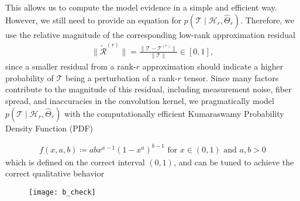 This allows us to compute the model evidence in a simple and efficient way.
However, we still need to provide an equation for $p
\left( \mathcal{T} \mid \mathcal{H}_r , \hat{\Theta}_r \right)$. Therefore, we
use the relative magnitude of the corresponding low-rank approximation residual 
\begin{align}
	\| \tilde{\mathcal{R}}^{\left( r \right)} \| = \frac{ \| \mathcal{T} -
	\mathcal{T}^{\left( r \right)} \| }{ \| \mathcal{T} \|} \in \left[ 0,1
	\right],
	\label{eq:residual}
\end{align}
since a smaller residual from a rank-$r$ approximation should indicate a higher probability of $\mathcal{T}$ being a perturbation of a rank-$r$ tensor. Since many factors contribute to the magnitude of this residual, including measurement noise, fiber spread, and inaccuracies in the convolution kernel, we pragmatically model
$p
\left( \mathcal{T} \mid \mathcal{H}_r , \hat{\Theta}_r \right)$ with the computationally efficient Kumaraswamy Probability Density Function (PDF) \cite{Kumaraswamy1980}

\begin{align}
	f \left( x, a, b \right) \coloneqq ab x^{a-1} \left( 1- x^a
	\right)^{b-1} \text{ for } x \in \left( 0,1 \right) \text{ and } a,b >
	0
	\label{eq:Kumaraswamy}
\end{align}
which is defined on the correct interval $(0,1)$, and can be tuned to achieve
the correct qualitative behavior 

\begin{figure}
	\centering
	\texttt{[image: b\_check]}
	\caption{}
	\label{fig:b}
\end{figure}

